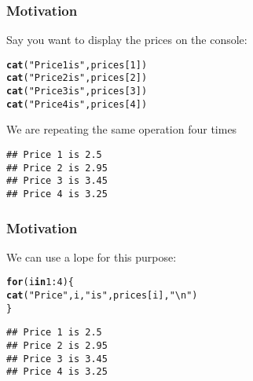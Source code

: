 \documentclass[12pt]{beamer}\usepackage[]{graphicx}\usepackage[]{color}
\makeatletter
\newcommand{\hlnum}[1]{\textcolor[rgb]{0.686,0.059,0.569}{#1}}%
\newcommand{\hlstr}[1]{\textcolor[rgb]{0.192,0.494,0.8}{#1}}%
\newcommand{\hlopt}[1]{\textcolor[rgb]{0,0,0}{#1}}%
\newcommand{\hlstd}[1]{\textcolor[rgb]{0.345,0.345,0.345}{#1}}%
\newcommand{\hlkwa}[1]{\textcolor[rgb]{0.161,0.373,0.58}{\textbf{#1}}}%
\newcommand{\hlkwd}[1]{\textcolor[rgb]{0.737,0.353,0.396}{\textbf{#1}}}%
\newenvironment{kframe}{%
 \def\at@end@of@kframe{}%
 \ifinner\ifhmode%
  \def\at@end@of@kframe{\end{minipage}}%
  \begin{minipage}{\columnwidth}%
 \fi\fi%
 \def\FrameCommand##1{\hskip\@totalleftmargin \hskip-\fboxsep
 \colorbox{shadecolor}{##1}\hskip-\fboxsep
     \hskip-\linewidth \hskip-\@totalleftmargin \hskip\columnwidth}%
 \MakeFramed {\advance\hsize-\width
   \@totalleftmargin\z@ \linewidth\hsize
   \@setminipage}}%
 {\par\unskip\endMakeFramed%
 \at@end@of@kframe}
\newenvironment{knitrout}{}{} %
\makeatother
\begin{document}
\begin{frame}[fragile]
\frametitle{Motivation}

Say you want to display the prices on the console:
\begin{knitrout}\footnotesize
{}\color{fgcolor}\begin{kframe}
\begin{alltt}
\hlkwd{cat}\hlstd{(}\hlstr{"Price 1 is"}\hlstd{, prices[}\hlnum{1}\hlstd{])}
\hlkwd{cat}\hlstd{(}\hlstr{"Price 2 is"}\hlstd{, prices[}\hlnum{2}\hlstd{])}
\hlkwd{cat}\hlstd{(}\hlstr{"Price 3 is"}\hlstd{, prices[}\hlnum{3}\hlstd{])}
\hlkwd{cat}\hlstd{(}\hlstr{"Price 4 is"}\hlstd{, prices[}\hlnum{4}\hlstd{])}
\end{alltt}
\end{kframe}
\end{knitrout}

We are repeating the same operation four times
\begin{knitrout}\footnotesize
{}\color{fgcolor}\begin{kframe}
\begin{verbatim}
## Price 1 is 2.5
## Price 2 is 2.95
## Price 3 is 3.45
## Price 4 is 3.25
\end{verbatim}
\end{kframe}
\end{knitrout}

\end{frame}


\begin{frame}[fragile]
\frametitle{Motivation}

We can use a  lope for this purpose:
\begin{knitrout}\footnotesize
{}\color{fgcolor}\begin{kframe}
\begin{alltt}
\hlkwa{for} \hlstd{(i} \hlkwa{in} \hlnum{1}\hlopt{:}\hlnum{4}\hlstd{) \{}
  \hlkwd{cat}\hlstd{(}\hlstr{"Price"}\hlstd{, i,} \hlstr{"is"}\hlstd{, prices[i],} \hlstr{"\textbackslash{}n"}\hlstd{)}
\hlstd{\}}
\end{alltt}
\begin{verbatim}
## Price 1 is 2.5 
## Price 2 is 2.95 
## Price 3 is 3.45 
## Price 4 is 3.25
\end{verbatim}
\end{kframe}
\end{knitrout}

\end{frame}
\end{document}
